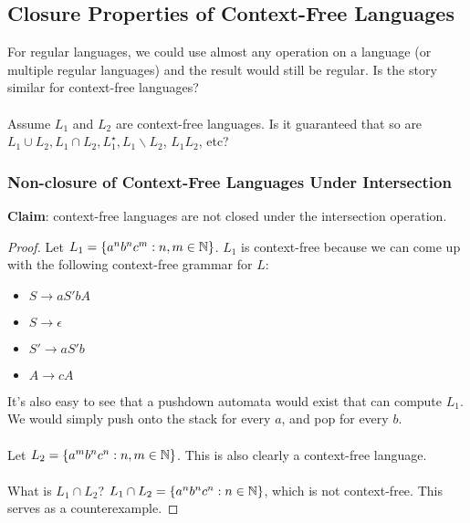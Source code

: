 \documentclass[]{article}
\DeclarePairedDelimiter{\set}{\lbrace}{\rbrace}
\theoremstyle{definition}
\begin{document}
      \subsection{Closure Properties of Context-Free Languages}
        For regular languages, we could use almost any operation on a language (or multiple regular languages) and the result would still be regular. Is the story similar for context-free languages?
        \\ \\
        Assume $L_1$ and $L_2$ are context-free languages. Is it guaranteed that so are $L_1 \cup L_2, L_1 \cap L_2, L_1^\star, L_1 \backslash L_2$, $L_1 L_2$, etc?

        \subsubsection{Non-closure of Context-Free Languages Under Intersection}
          \textbf{Claim}: context-free languages are not closed under the intersection operation.

          \begin{proof}
            Let $L_1 = \set{a^n b^n c^m : n, m \in \mathbb{N}}$. $L_1$ is context-free because we can come up with the following context-free grammar for $L$:
            \begin{itemize}
              \item $S \to aS' bA$
              \item $S \to \epsilon$
              \item $S' \to aS'b$
              \item $A \to cA$
            \end{itemize}

            It's also easy to see that a pushdown automata would exist that can compute $L_1$. We would simply push onto the stack for every $a$, and pop for every $b$.
            \\ \\
            Let $L_2 = \set{a^m b^n c^n : n, m \in \mathbb{N}}$. This is also clearly a context-free language.
            \\ \\
            What is $L_1 \cap L_2$? $L_1 \cap L_2 = \set{a^n b^n c^n : n \in \mathbb{N}}$, which is not context-free. This serves as a counterexample.
          \end{proof}
\end{document}
